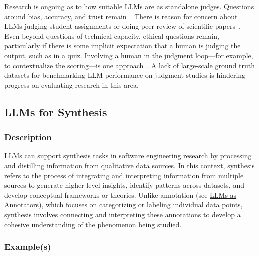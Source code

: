 Research is ongoing as to how suitable LLMs are as standalone judges. Questions around bias, accuracy, and trust remain~\cite{DBLP:journals/corr/abs-2406-18403}. There is reason for concern about LLMs judging student assignments or doing peer review of scientific papers~\cite{DBLP:conf/coling/ZhouC024}. Even beyond questions of technical capacity, ethical questions remain, particularly if there is some implicit expectation that a human is judging the output, such as in a quiz. Involving a human in the judgment loop---for example, to contextualize the scoring---is one approach~\cite{panHumanCenteredDesignRecommendations2024}. 
A lack of large-scale ground truth datasets for benchmarking LLM performance on judgment studies is hindering progress on evaluating research in this area.

\subsection{LLMs for Synthesis}

\subsubsection{Description}

LLMs can support synthesis tasks in software engineering research by processing and distilling information from qualitative data sources.
In this context, synthesis refers to the process of integrating and interpreting information from multiple sources to generate higher-level insights, identify patterns across datasets, and develop conceptual frameworks or theories. Unlike annotation (see \href{/study-types/#llms-as-annotators}{LLMs as Annotators}), which focuses on categorizing or labeling individual data points, synthesis involves connecting and interpreting these annotations to develop a cohesive understanding of the phenomenon being studied.

\subsubsection{Example(s)} 

